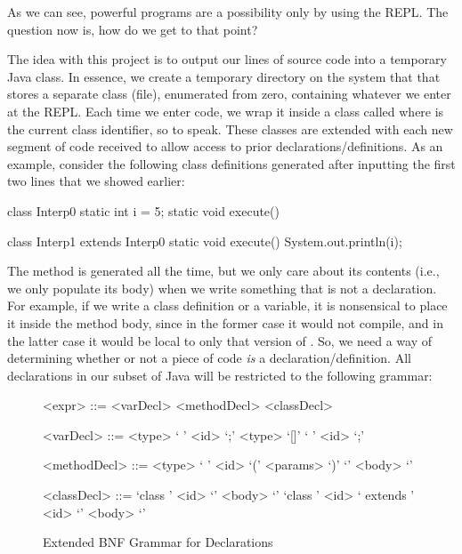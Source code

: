 As we can see, powerful programs are a possibility only by using the REPL. The question now is, how do we get to that point?

The idea with this project is to output our lines of source code into a temporary Java class. In essence, we create a temporary directory on the system that that stores a separate class (file), enumerated from zero, containing whatever we enter at the REPL. Each time we enter code, we wrap it inside a class called  where  is the current class identifier, so to speak. These classes are extended with each new segment of code received to allow access to prior declarations/definitions. As an example, consider the following class definitions generated after inputting the first two lines that we showed earlier:

\begin{verbnobox}[\small]
class Interp0 {
  static int i = 5;
  static void execute() {}
}

class Interp1 extends Interp0 {
  static void execute() {
    System.out.println(i);  
  }
}
\end{verbnobox}

The  method is generated all the time, but we only care about its contents (i.e., we only populate its body) when we write something that is not a declaration. For example, if we write a class definition or a variable, it is nonsensical to place it inside the  method body, since in the former case it would not compile, and in the latter case it would be local to only that version of . So, we need a way of determining whether or not a piece of code \emph{is} a declaration/definition. All declarations in our subset of Java will be restricted to the following grammar:

\setlength{\grammarparsep}{20pt plus 1pt minus 1pt} %
\setlength{\grammarindent}{12em} %
\begin{figure}[H]
        \begin{grammar}
            <expr> ::= <varDecl> 
                    \alt <methodDecl> 
                    \alt <classDecl>

            <varDecl> ::= <type> ` ' <id> `;'
                      \alt <type> `[]' ` ' <id> `;'

            <methodDecl> ::= <type> ` ' <id> `(' <params> `)' `{' <body> `}'

            <classDecl> ::= `class ' <id> `{' <body> `}'
                        \alt `class ' <id> ` extends ' <id> `{' <body> `}'

        \end{grammar}
    \caption{ Extended BNF Grammar for Declarations }
\end{figure}

